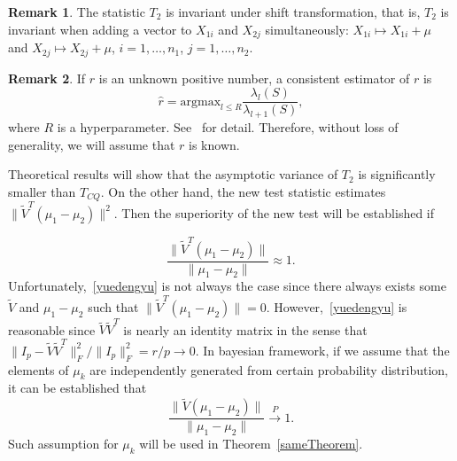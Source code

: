 \documentclass[review]{elsarticle}
\theoremstyle{plain}
\theoremstyle{definition}
\newtheorem{remark}{\quad\quad Remark}
\theoremstyle{remark}
\begin{document}
\begin{remark} The statistic $T_2$ is invariant under shift transformation, that is, $T_2$ is invariant when adding a vector to $X_{1i}$ and $X_{2j}$ simultaneously: $X_{1i}\mapsto X_{1i}+\mu$ and $X_{2j}\mapsto X_{2j}+\mu$, $i=1,\ldots,n_1$, $j=1,\ldots,n_2$.
\end{remark}


\begin{remark}
If $r$ is an unknown positive number, a consistent estimator of $r$ is
\begin{equation}\label{estimateR}
    \hat{r}=\textrm{argmax}_{l\leq R}\frac{\lambda_l(S)}{\lambda_{l+1}(S)},
\end{equation}
where $R$ is a hyperparameter. See~\cite{Ahn2009Eigenvalue} for detail. Therefore, without loss of generality, we will assume that $r$ is known.
\end{remark}

    Theoretical results will show that the asymptotic variance of $T_2$ is significantly smaller than $T_{CQ}$. 
    On the other hand, the new test statistic estimates $\|\tilde{V}^T(\mu_1-\mu_2)\|^2$.
    Then the superiority of the new test will be established if 
    
\begin{equation}\label{yuedengyu}
    \frac{\|\tilde{V}^T(\mu_1-\mu_2)\|}{\|\mu_1-\mu_2\|}\approx 1.
\end{equation}
Unfortunately,~\eqref{yuedengyu}
is not always the case since there always exists some
$\tilde{V}$ and $\mu_1-\mu_2$ such that $\|\tilde{V}^T(\mu_1-\mu_2)\|=0$.
However,~\eqref{yuedengyu} is reasonable since $\tilde{V}\tilde{V}^T$ is nearly an identity matrix in the sense that
    ${\|I_p-\tilde{V}\tilde{V}^T\|_F^2}/{\|I_p\|_F^2}=r/p\to 0$. 
In bayesian framework, if we assume that the elements of $\mu_k$ are independently generated from certain probability distribution, it can be established that 
\begin{equation*}
    \frac{\|\tilde{V}(\mu_1-\mu_2)\|}{\|\mu_1-\mu_2\|}\xrightarrow{P}1.
\end{equation*}
Such assumption for $\mu_k$ will be used in Theorem~\ref{sameTheorem}.



\end{document}
